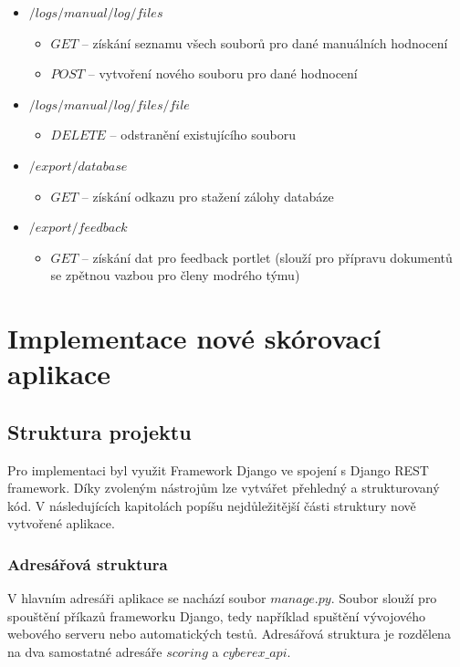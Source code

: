 \documentclass[
  digital, %
  twoside, %
  table,   %
  lof,     %
  lot,     %
]{fithesis3}
\begin{document}
\begin{itemize}
    \item $/logs/manual/{log}/files$
    \begin{itemize}
        \item $GET$ -- získání seznamu všech souborů pro dané manuálních hodnocení
        \item $POST$ -- vytvoření nového souboru pro dané hodnocení
    \end{itemize}
            
    \item $/logs/manual/{log}/files/{file}$
    \begin{itemize}
        \item $DELETE$ -- odstranění existujícího souboru
    \end{itemize}
            
    \item $/export/database$
    \begin{itemize}
        \item $GET$ -- získání odkazu pro stažení zálohy databáze
    \end{itemize}
                
    \item $/export/feedback$
    \begin{itemize}
        \item $GET$ -- získání dat pro feedback portlet (slouží pro přípravu dokumentů se zpětnou vazbou pro členy modrého týmu)
    \end{itemize}

\end{itemize}


\chapter{Implementace nové skórovací aplikace}

\section{Struktura projektu}
Pro implementaci byl využit Framework Django ve spojení s Django REST framework. Díky zvoleným nástrojům lze vytvářet přehledný a strukturovaný kód. V následujících kapitolách popíšu nejdůležitější části struktury nově vytvořené aplikace.

\subsection{Adresářová struktura}
V hlavním adresáři aplikace se nachází soubor $manage.py$. Soubor slouží pro spouštění příkazů frameworku Django, tedy například spuštění vývojového webového serveru nebo automatických testů. Adresářová struktura je rozdělena na dva samostatné adresáře $scoring$ a $cyberex\_api$.
\end{document}
